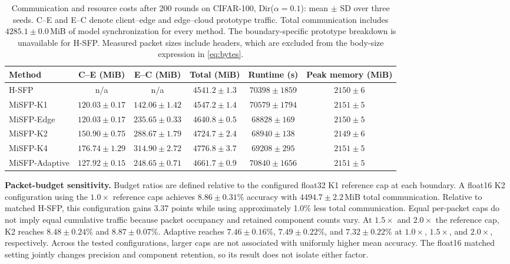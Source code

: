 \begin{table}[t]
\caption{Communication and resource costs after 200 rounds on CIFAR-100, Dir($\alpha=0.1$): mean $\pm$ SD over three seeds. C--E and E--C denote client--edge and edge--cloud prototype traffic. Total communication includes $4285.1\pm0.0$\,MiB of model synchronization for every method. The boundary-specific prototype breakdown is unavailable for H-SFP. Measured packet sizes include headers, which are excluded from the body-size expression in \cref{eq:bytes}.}
\label{tab:resources}
\centering
\footnotesize
\setlength{\tabcolsep}{4pt}
\begin{tabular*}{\textwidth}{@{\extracolsep{\fill}}lccccc@{}}
\toprule
Method & C--E (MiB) & E--C (MiB) & Total (MiB) & Runtime (s) & Peak memory (MiB)\\
\midrule
H-SFP & n/a & n/a & $4541.2\pm1.3$ & $70398\pm1859$ & $2150\pm6$\\
MiSFP-K1 & $120.03\pm0.17$ & $142.06\pm1.42$ & $4547.2\pm1.4$ & $70579\pm1794$ & $2151\pm5$\\
MiSFP-Edge & $120.03\pm0.17$ & $235.65\pm0.33$ & $4640.8\pm0.5$ & $68828\pm169$ & $2150\pm5$\\
MiSFP-K2 & $150.90\pm0.75$ & $288.67\pm1.79$ & $4724.7\pm2.4$ & $68940\pm138$ & $2149\pm6$\\
MiSFP-K4 & $176.74\pm1.29$ & $314.90\pm2.72$ & $4776.8\pm3.7$ & $69208\pm295$ & $2151\pm5$\\
MiSFP-Adaptive & $127.92\pm0.15$ & $248.65\pm0.71$ & $4661.7\pm0.9$ & $70840\pm1656$ & $2151\pm5$\\
\bottomrule
\end{tabular*}
\end{table}

\noindent\textbf{Packet-budget sensitivity.} Budget ratios are defined relative to the configured float32 K1 reference cap at each boundary. A float16 K2 configuration using the $1.0\times$ reference caps achieves $8.86\pm0.31\%$ accuracy with $4494.7\pm2.2$\,MiB total communication. Relative to matched H-SFP, this configuration gains 3.37 points while using approximately 1.0\% less total communication. Equal per-packet caps do not imply equal cumulative traffic because packet occupancy and retained component counts vary.
At $1.5\times$ and $2.0\times$ the reference cap, K2 reaches $8.48\pm0.24\%$ and $8.87\pm0.07\%$. Adaptive reaches $7.46\pm0.16\%$, $7.49\pm0.22\%$, and $7.32\pm0.22\%$ at $1.0\times$, $1.5\times$, and $2.0\times$, respectively. Across the tested configurations, larger caps are not associated with uniformly higher mean accuracy. The float16 matched setting jointly changes precision and component retention, so its result does not isolate either factor.

